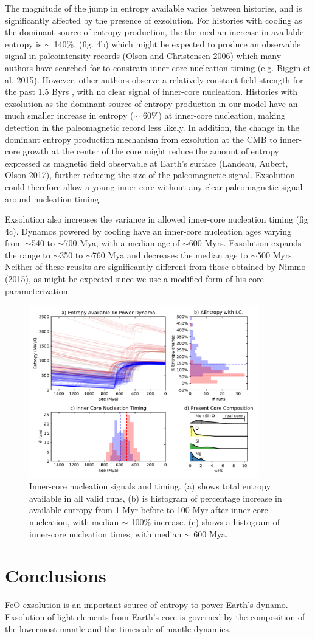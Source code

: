 \documentclass[]{article}
\begin{document}
	The magnitude of the jump in entropy available varies between histories, and is significantly affected by the presence of exsolution. For histories with cooling as the dominant source of entropy production, the the median increase in available entropy is $\sim$ 140\%, (fig. 4b) which might be expected to produce an observable signal in paleointensity records (Olson and Christensen 2006) which many authors have searched for to constrain inner-core nucleation timing (e.g. Biggin et al. 2015). However, other authors observe a relatively constant field strength for the past 1.5 Byrs \citep{Sprain2018}, with no clear signal of inner-core nucleation. Histories with exsolution as the dominant source of entropy production in our model have an much smaller increase in entropy ($\sim$ 60\%) at inner-core nucleation, making detection in the paleomagnetic record less likely. In addition, the change in the dominant entropy production mechanism from exsolution at the CMB to inner-core growth at the center of the core might reduce the amount of entropy expressed as magnetic field observable at Earth's surface (Landeau, Aubert, Olson 2017), further reducing the size of the paleomagnetic signal. Exsolution could therefore allow a young inner core without any clear paleomagnetic signal around nucleation timing.  
	
	Exsolution also increases the variance in allowed inner-core nucleation timing (fig 4c). Dynamos powered by cooling have an inner-core nucleation ages varying from $\sim$540 to $\sim$700 Mya, with a median age of $\sim$600 Myrs. Exsolution expands the range to $\sim$350 to $\sim$760 Mya and decreases the median age to $\sim$500 Myrs. Neither of these reuslts are significantly different from those obtained by Nimmo (2015), as might be expected since we use a modified form of his core parameterization.
	
	\begin{figure}\centering
		\includegraphics[width=10cm]{./figures/figure4.pdf}
		\caption{Inner-core nucleation signals and timing. (a) shows total entropy available in all valid runs, (b) is histogram of percentage increase in available entropy from 1 Myr before to 100 Myr after inner-core nucleation, with median $\sim$ 100\% increase. (c) shows a histogram of inner-core nucleation times, with median $\sim$ 600 Mya.}
		\label{fig4}
	\end{figure}
	
	\section{Conclusions}\label{conclusions}
	FeO exsolution is an important source of entropy to power Earth's
	dynamo. Exsolution of light elements from Earth's core is governed by
	the composition of the lowermost mantle and the timescale of mantle dynamics.
	
	
	
\end{document}
